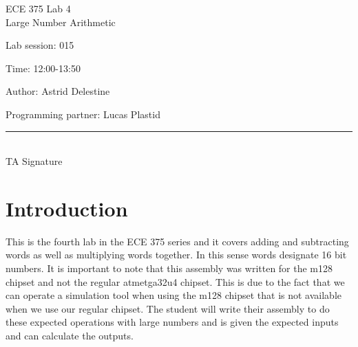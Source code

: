 \documentclass[12pt,letterpaper]{article}
\begin{document}
\begin{titlepage}
    \vspace*{4cm}
    \begin{flushright}
    {\huge
        ECE 375 Lab 4\\[1cm]
    }
    {\large
    	Large Number Arithmetic
    }
    \end{flushright}
    \begin{flushleft}
    Lab session: 015
    
    Time: 12:00-13:50
    \end{flushleft}
    \begin{flushright}
    Author: Astrid Delestine

    Programming partner: Lucas Plastid 

    \vfill
    \rule{5in}{.5mm}\\
    TA Signature
    \end{flushright}

\end{titlepage}

\section{Introduction}
This is the fourth lab in the ECE 375 series and it covers adding and subtracting words as well as multiplying words together. In this sense words designate 16 bit numbers. It is important to note that this assembly was written for the m128 chipset and not the regular atmetga32u4 chipset. This is due to the fact that we can operate a simulation tool when using the m128 chipset that is not available when we use our regular chipset. The student will write their assembly to do these expected operations with large numbers and is given the expected inputs and can calculate the outputs.
\end{document}
